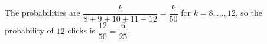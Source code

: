 The probabilities are $\dfrac{k}{8+9+10+11+12}=\dfrac{k}{50}$ for $k=8,\dots,12$, so the probability of $12$ clicks is $\dfrac{12}{50}=\boxed{\dfrac{6}{25}}$.
